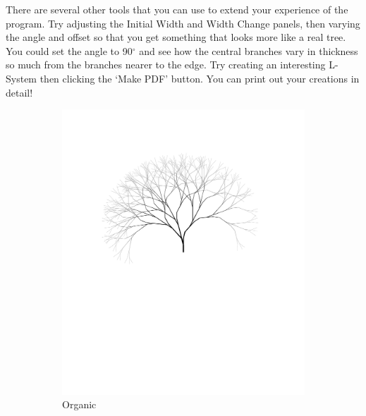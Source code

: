 \documentclass[12pt,twoside]{reedthesis}
\begin{document}
	There are several other tools that you can use to extend your experience of the program. Try adjusting the Initial Width and Width Change panels, then varying the angle and offset so that you get something that looks more like a real tree. You could set the angle to 90$^{\circ}$ and see how the central branches vary in thickness so much from the branches nearer to the edge. Try creating an interesting L-System then clicking the `Make PDF' button. You can print out your creations in detail!
	
	
	\begin{figure}[h]
	\begin{subfigure}{0.5\textwidth}
		\centering
		\includegraphics[clip=true, viewport=1.5in 4.5in 8.5in 11in, height = 0.9\textwidth]{Images/HowToExplore5A}
		\caption{Organic\footnotemark}
		\label {HowToExplore5A}
	\end{subfigure}%
	\begin{subfigure}{0.5\textwidth}
		\centering

\end{subfigure}
\end{figure}
\end{document}
